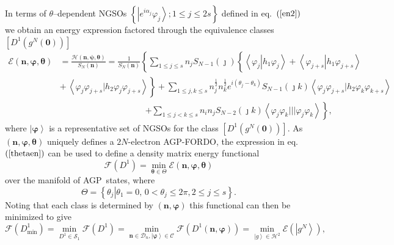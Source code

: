 \documentclass[aps,preprint]{revtex4}%
\begin{document}
In terms of $\theta$--dependent NGSOs $\left\{  \left\vert e^{i\alpha_{j}%
}\varphi_{j}\right\rangle ;1\leq j\leq2s\right\}  $ defined in eq.\ $\left(
\ref{en2}\right)  $ we obtain an energy expression factored through the
equivalence classes $\left[  D^{1}\left(  g^{N}\left(  \bm{0}\right)  \right)
\right]  $
\begin{align}
\mathcal{E}\left(  \bm{n},\bm{\varphi},\bm{\theta}\right)   &  =\frac
{\mathcal{H}\left(  \bm{n},\bm{\psi},\bm{\theta}\right)  }{S_{N}\left(
\bm{n}\right)  }=\frac{1}{S_{N}\left(  \bm{n}\right)  }\left\{  \sum_{1\leq
j\leq s}n_{j}S_{N-1}\left(  \jmath\right)  \left\{  \overset{}{\left\langle
\varphi_{j}\left\vert h_{1}\varphi_{j}\right.  \right\rangle +\left\langle
\varphi_{j+s}\left\vert h_{1}\varphi_{j+s}\right.  \right\rangle }\right.
\right. \nonumber\\
&  \left.  +\overset{}{\,\left\langle \varphi_{j}\varphi_{j+s}|h_{2}%
\varphi_{j}\varphi_{j+s}\right\rangle }\right\}  +\sum_{1\leq j,k\leq s}%
n_{j}^{\frac{1}{2}}n_{k}^{\frac{1}{2}}e^{i\left(  \theta_{j}-\theta
_{k}\right)  }S_{N-1}\left(  \jmath k\right)  \left\langle \varphi_{j}%
\varphi_{j+s}|h_{2}\varphi_{k}\varphi_{k+s}\right\rangle \nonumber\\
&  \qquad\qquad\qquad\qquad\qquad\left.  +\sum_{1\leq j<k\leq s}n_{i}%
n_{j}S_{N-2}\left(  \jmath k\right)  \left\langle \varphi_{j}\varphi
_{k}|||\varphi_{j}\varphi_{k}\right\rangle \right\}  , \label{thetaen}%
\end{align}
where $\left\vert \bm{\varphi}\right\rangle $ is a representative set of NGSOs
for the class $\left[  D^{1}\left(  g^{N}\left(  \bm{0}\right)  \right)
\right]  $. As $\left(  \bm{n},\bm{\varphi,\theta}\right)  $ uniquely defines
a $2N$-electron AGP-FORDO, the expression in eq.\ $\left(  \ref{thetaen}%
\right)  $ can be used to define a density matrix energy functional
\begin{equation}
\mathcal{F}\left(  D^{1}\right)  =\min_{\bm{\theta\in}\Theta}\mathcal{E}%
\left(  \bm{n},\bm{\varphi},\bm{\theta}\right)
\end{equation}
over the manifold of AGP\ states, where
\begin{equation}
\Theta=\left\{  \left.  \theta_{j}\right\vert \theta_{1}=0,\,0<\theta_{j}%
\leq2\pi,2\leq j\leq s\right\}  .
\end{equation}
Noting that each class is determined by $\left(  \bm{n},\bm{\varphi
}\right)  $ this functional can then be minimized to give
\begin{equation}
\mathcal{F}\left(  D_{\min}^{1}\right)  =\min_{D^{1}\in\mathcal{S}_{1}%
}\mathcal{F}\left(  D^{1}\right)  =\min_{\bm{n\in}\mathcal{D}_{n},\left\vert
\bm{\varphi}\right\rangle \in\mathcal{C}}\mathcal{F}\left(  D^{1}\left(
\bm{n},\bm{\varphi}\right)  \right)  =\min_{\left\vert g\right\rangle
\in\mathcal{H}^{2}}\mathcal{E}\left(  \left\vert g^{N}\right\rangle \right)  ,
\label{MinDMF}%
\end{equation}
\end{document}
